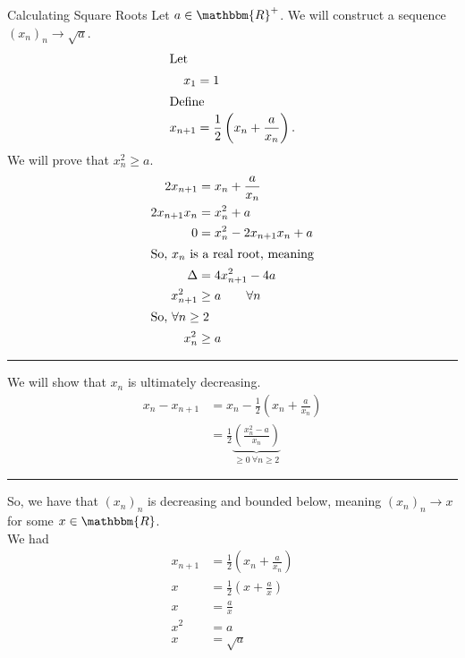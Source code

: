 \documentclass[10pt]{extarticle}
\newcommand{\R}{\mathbbm{R}}
\begin{document}
  \begin{problem}{Calculating Square Roots}
    Let $a\in\R^+$. We will construct a sequence $\left(x_n\right)_n \rightarrow \sqrt{a}$.
    \begin{align*}
      \shortintertext{Let}
      x_{1} &= 1\\
      \shortintertext{Define}
      x_{n+1} &= \frac{1}{2}\left(x_{n} + \frac{a}{x_n}\right).
    \end{align*}
    \tcblower
    We will prove that $x_{n}^2 \geq a$.
    \begin{align*}
      2x_{n+1} &= x_{n} + \frac{a}{x_n}\\
      2x_{n+1}x_n &= x_{n}^2 + a\\
      0 &= x_{n}^2 - 2x_{n+1}x_{n} + a\\
      \shortintertext{So, $x_{n}$ is a real root, meaning}
      \Delta &= 4x_{n+1}^2 - 4a\\
      x_{n+1}^2 &\geq a \tag*{$\forall n$}\\
      \shortintertext{So, $\forall n\geq 2$}
      x_{n}^2 &\geq a
    \end{align*}
    \vspace{4pt}
    \rule{\textwidth}{0.4pt}
    \vspace{4pt}
    We will show that $x_n$ is ultimately decreasing.
    \begin{align*}
      x_n - x_{n+1} &= x_{n} - \frac{1}{2}\left(x_n + \frac{a}{x_n}\right)\\
                    &= \frac{1}{2}\underbrace{\left(\frac{x_n^2 - a}{x_n}\right)}_{\geq 0~\forall n\geq 2}
    \end{align*}
    \vspace{4pt}
    \rule{\textwidth}{0.4pt}
    \vspace{4pt}
    So, we have that $\left(x_n\right)_n$ is decreasing and bounded below, meaning $(x_n)_n \rightarrow x$ for some $x\in\R$.\\

    We had
    \begin{align*}
      x_{n+1} &= \frac{1}{2}\left(x_n + \frac{a}{x_n}\right)\\
      x &= \frac{1}{2}\left(x + \frac{a}{x}\right)\\
      x &= \frac{a}{x}\\
      x^2 &= a\\
      x &= \sqrt{a} \tag*{remember that $x > 0$}
    \end{align*}
  \end{problem}
\end{document}
